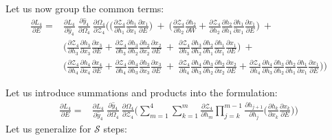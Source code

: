 \documentclass{article}
\begin{document}
Let us now group the common terms:
\begin{align*}
	\frac{\partial L_4}{ \partial{E}} = &\frac{\partial L_4}{\partial \hat{y}_4}~\frac{\partial \hat{y}_4}{\partial \Omega_4}~\frac{\partial \Omega_4}{ \partial \mathcal{Z}_4} \biggl( 
	\biggl( \frac{\partial \mathcal{Z}_4}{ \partial h_1} \frac{\partial h_1}{ \partial x_1} \frac{\partial x_1}{ \partial E} \biggl) ~+~ 
	\biggl( \frac{\partial \mathcal{Z}_4}{ \partial h_2} \frac{\partial h_2}{ \partial W} + \frac{\partial \mathcal{Z}_4}{ \partial h_2} \frac{\partial h_2}{ \partial h_1}\frac{\partial h_1}{ \partial x_1}\frac{\partial x_1}{ \partial E} \biggl)~+~\\
	& 
	 \biggl( \frac{\partial \mathcal{Z}_4}{ \partial h_3} \frac{\partial h_3}{ \partial x_3}\frac{\partial x_3}{ \partial E} + \frac{\partial \mathcal{Z}_4}{ \partial h_3} \frac{\partial h_3}{ \partial h_2}\frac{\partial h_2}{ \partial x_2}\frac{\partial x_2}{ \partial E}~+~ \frac{\partial \mathcal{Z}_4}{ \partial h_3} \frac{\partial h_3}{ \partial h_2}\frac{\partial h_2}{ \partial h_1}\frac{\partial h_1}{ \partial x_1}\frac{\partial x_1}{ \partial E} \biggl) ~+~\\
	 &
	 \biggl( \frac{\partial \mathcal{Z}_4}{ \partial h_4} \frac{\partial h_4}{ \partial x_4}\frac{\partial x_4}{ \partial E} +  \frac{\partial \mathcal{Z}_4}{ \partial h_4} \frac{\partial h_4}{ \partial h_3}\frac{\partial h_3}{ \partial x_3}\frac{\partial x_3}{ \partial E}~+~
	 \frac{\partial \mathcal{Z}_4}{ \partial h_4} \frac{\partial h_4}{ \partial h_3}\frac{\partial h_3}{ \partial h_2}\frac{\partial h_2}{ \partial x_2}\frac{\partial x_2}{ \partial E}
	+
	\frac{\partial \mathcal{Z}_4}{ \partial h_4} \frac{\partial h_4}{ \partial h_3}\frac{\partial h_3}{ \partial h_2}\frac{\partial h_2}{ \partial h_1}\frac{\partial h_1}{ \partial x_1}\frac{\partial x_1}{ \partial E} \biggl)
	\biggl)
\end{align*}

Let us introduce summations and products into the formulation:
\begin{align*}
	\frac{\partial L_4}{ \partial{E}} = &\frac{\partial L_4}{\partial \hat{y}_4}~\frac{\partial \hat{y}_4}{\partial \Omega_4}~\frac{\partial \Omega_4}{ \partial \mathcal{Z}_4} \biggl( 
	\sum_{m=1}^{4}
	\sum_{k=1}^{m} \frac{\partial \mathcal{Z}_4}{ \partial h_m} 
	\prod_{j=k}^{m-1} \frac{\partial h_{j+1}}{ \partial h_j} 
	\biggl( \frac{\partial h_k}{ \partial x_k}\frac{\partial x_k}{ \partial E} \biggl) \biggl)
\end{align*}
Let us generalize for $\mathcal{S}$ steps:
\end{document}
